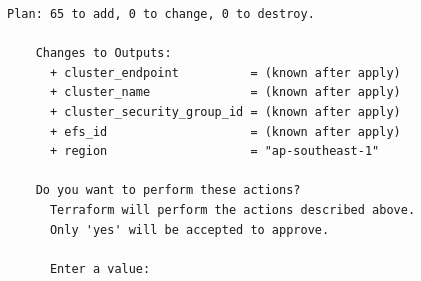 \begin{lstlisting}[caption={terraform plan output for \texttt{cloudkube} provisioning}, breaklines=true, breakatwhitespace=false]
    Plan: 65 to add, 0 to change, 0 to destroy.
    
    Changes to Outputs:
      + cluster_endpoint          = (known after apply)
      + cluster_name              = (known after apply)
      + cluster_security_group_id = (known after apply)
      + efs_id                    = (known after apply)
      + region                    = "ap-southeast-1"
    
    Do you want to perform these actions?
      Terraform will perform the actions described above.
      Only 'yes' will be accepted to approve.
    
      Enter a value: 
    
    
\end{lstlisting}
